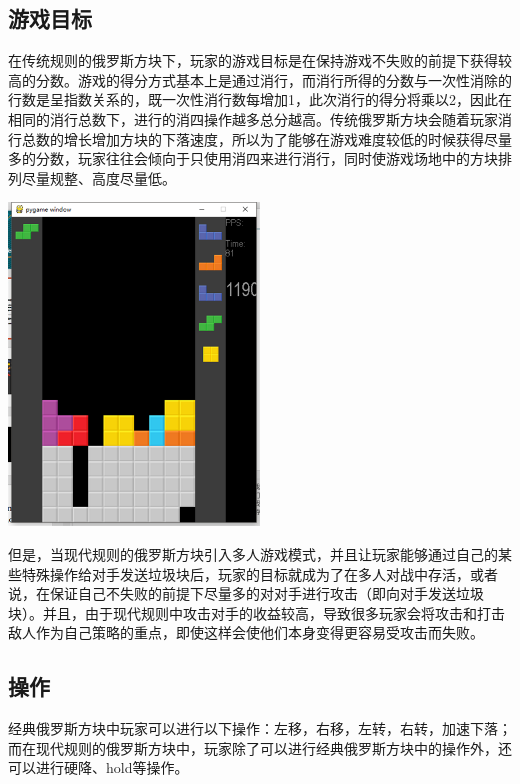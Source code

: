 \documentclass[10pt,UTF8]{article}
\newenvironment{Figure}
  {\par\medskip\noindent\minipage{\linewidth}}
  {\endminipage\par\medskip}
\begin{document}
\begin{multicols}{2}
\subsection{游戏目标}
在传统规则的俄罗斯方块下，玩家的游戏目标是在保持游戏不失败的前提下获得较高的分数。游戏的得分方式基本上是通过消行，而消行所得的分数与一次性消除的行数是呈指数关系的，既一次性消行数每增加1，此次消行的得分将乘以2，因此在相同的消行总数下，进行的消四操作越多总分越高。传统俄罗斯方块会随着玩家消行总数的增长增加方块的下落速度，所以为了能够在游戏难度较低的时候获得尽量多的分数，玩家往往会倾向于只使用消四来进行消行，同时使游戏场地中的方块排列尽量规整、高度尽量低。

\begin{Figure}
    \centering
    \includegraphics[width=0.5\textwidth]{figure/ours.png}
\end{Figure}

但是，当现代规则的俄罗斯方块引入多人游戏模式，并且让玩家能够通过自己的某些特殊操作给对手发送垃圾块后，玩家的目标就成为了在多人对战中存活，或者说，在保证自己不失败的前提下尽量多的对对手进行攻击（即向对手发送垃圾块）。并且，由于现代规则中攻击对手的收益较高，导致很多玩家会将攻击和打击敌人作为自己策略的重点，即使这样会使他们本身变得更容易受攻击而失败。


\subsection{操作}

经典俄罗斯方块中玩家可以进行以下操作：左移，右移，左转，右转，加速下落；而在现代规则的俄罗斯方块中，玩家除了可以进行经典俄罗斯方块中的操作外，还可以进行硬降、hold等操作。


\end{multicols}
\end{document}
